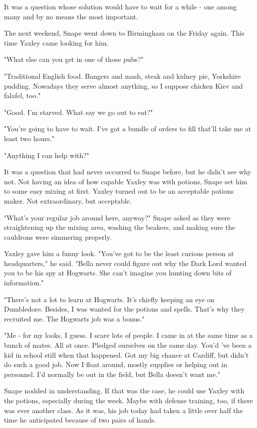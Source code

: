 It was a question whose solution would have to wait for a while - one among many and by no means the most important.

The next weekend, Snape went down to Birmingham on the Friday again. This time Yaxley came looking for him.

"What else can you get in one of those pubs?"

"Traditional English food. Bangers and mash, steak and kidney pie, Yorkshire pudding. Nowadays they serve almost anything, so I suppose chicken Kiev and falafel, too."

"Good. I'm starved. What say we go out to eat?"

"You're going to have to wait. I've got a bundle of orders to fill that'll take me at least two hours."

"Anything I can help with?"

It was a question that had never occurred to Snape before, but he didn't see why not. Not having an idea of how capable Yaxley was with potions, Snape set him to some easy mixing at first. Yaxley turned out to be an acceptable potions maker. Not extraordinary, but acceptable.

"What's your regular job around here, anyway?" Snape asked as they were straightening up the mixing area, washing the beakers, and making sure the cauldrons were simmering properly.

Yaxley gave him a funny look. "You've got to be the least curious person at headquarters," he said. "Bella never could figure out why the Dark Lord wanted you to be his spy at Hogwarts. She can't imagine you hunting down bits of information."

"There's not a lot to learn at Hogwarts. It's chiefly keeping an eye on Dumbledore. Besides, I was wanted for the potions and spells. That's why they recruited me. The Hogwarts job was a bonus."

"Me - for my looks, I guess. I scare lots of people. I came in at the same time as a bunch of mates. All at once. Pledged ourselves on the same day. You'd 've been a kid in school still when that happened. Got my big chance at Cardiff, but didn't do such a good job. Now I float around, mostly supplies or helping out in personnel. I'd normally be out in the field, but Bella doesn't want me."

Snape nodded in understanding. If that was the case, he could use Yaxley with the potions, especially during the week. Maybe with defense training, too, if there was ever another class. As it was, his job today had taken a little over half the time he anticipated because of two pairs of hands.

